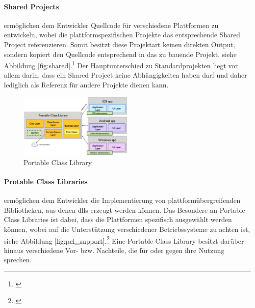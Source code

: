 \paragraph{Shared Projects}

ermöglichen dem Entwickler Quellcode für verschiedene Plattformen zu entwickeln, wobei die plattformspezifischen Projekte das entsprechende Shared Project referenzieren. Somit besitzt diese Projektart keinen direkten Output, sondern kopiert den Quellcode entsprechend in das zu bauende Projekt, siehe Abbildung \eqref{fig:shared}.\footnote{\citep[vgl.][Shared Projects - Xamarin]{Xamarin.SharedProjects}\label{note39}} Der Hauptunterschied zu Standardprojekten liegt vor allem darin, dass ein Shared Project keine Abhängigkeiten haben darf und daher lediglich als Referenz für andere Projekte dienen kann.

\begin{figure}
	\begin{center}
		\includegraphics[width=0.5\textwidth]{images/technische_grundlagen/PortableClassLibrary.png}
	\end{center}
	\caption{Portable Class Library \cite{Xamarin.PortableClass}}
	\label{fig:portable}
\end{figure}

\paragraph{Protable Class Libraries}

ermöglichen dem Entwickler die Implementierung von plattformübergreifenden Bibliotheken, aus denen \glspl{dll} erzeugt werden können. Das Besondere an Portable Class Libraries ist dabei, dass die Plattformen spezifisch ausgewählt werden können, wobei auf die Unterstützung verschiedener Betriebssysteme zu achten ist, siehe Abbildung \eqref{fig:pcl_support}.\footnote{\citep[vgl.][Introduction to Portable Class Libraries - Xamarin]{Xamarin.PortableClass}\label{note40}} Eine Portable Class Library besitzt darüber hinaus verschiedene Vor- bzw. Nachteile, die für oder gegen ihre Nutzung sprechen.\\

